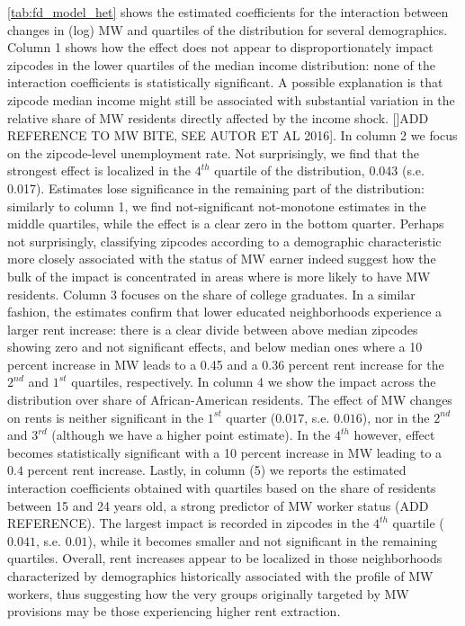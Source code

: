 \autoref{tab:fd_model_het} shows the estimated coefficients for the interaction between changes in 
(log) MW and quartiles of the distribution for several demographics. Column 1 shows how 
the effect does not appear to disproportionately impact zipcodes in the lower quartiles of the 
median income distribution: none of the interaction coefficients is statistically significant. A possible 
explanation is that zipcode median income might still be associated with
substantial variation in the relative share of MW residents directly affected by the income shock.
[]ADD  REFERENCE TO MW BITE, SEE AUTOR ET AL 2016]. 
In column 2 we focus on the zipcode-level unemployment rate. Not surprisingly, we find that the 
strongest effect is localized in the $4^{th}$ quartile of the distribution, 0.043 (s.e. 0.017). 
Estimates lose significance in the remaining part of the distribution: similarly to column 1, we 
find not-significant not-monotone estimates in the middle quartiles, while the effect is a clear 
zero in the bottom quarter. Perhaps not surprisingly, classifying zipcodes according to a demographic
characteristic more closely associated with the status of MW earner indeed suggest how the bulk of the 
impact is concentrated in areas where is more likely to have MW residents. Column 3 
focuses on the share of college graduates. In a similar fashion, the estimates 
confirm that lower educated neighborhoods experience a larger rent increase: there is a 
clear divide between above median zipcodes showing zero and not significant effects, and below 
median ones where a 10 percent increase in MW leads to a 0.45 and a 0.36 percent rent increase for 
the $2^{nd}$ and $1^{st}$ quartiles, respectively. In column 4 we show the impact across 
the distribution over share of African-American residents. The effect of MW changes 
on rents is neither significant in the $1^{st}$ quarter ($0.017$, s.e. $0.016$), nor in the 
$2^{nd}$ and $3^{rd}$ (although we have a higher point estimate). In the $4^{th}$ however, effect 
becomes statistically significant with a 10 percent increase in MW leading to a $0.4$ percent rent 
increase. Lastly, in column (5) we reports the estimated interaction coefficients obtained with quartiles 
based on the share of residents between 15 and 24 years old, a strong predictor of MW worker status 
(ADD REFERENCE). The largest impact is recorded in zipcodes in the $4^{th}$ quartile ($0.041$, s.e. $0.01$), 
while it becomes smaller and not significant in the remaining quartiles.  Overall, rent increases appear to be localized 
in those neighborhoods characterized by demographics historically associated with the profile of MW workers, 
thus suggesting how the very groups originally targeted by MW provisions may be those experiencing higher 
rent extraction. 

